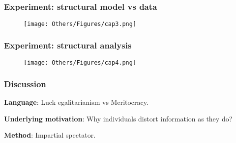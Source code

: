 \documentclass[usenames,dvipsnames,aspectratio=169,11pt, envcountsect]{beamer}
\begin{document}
\begin{frame}\frametitle{Experiment: structural model vs data}
	\begin{figure}
		\texttt{[image: Others/Figures/cap3.png]}
	\end{figure}
\end{frame}

\begin{frame}\frametitle{Experiment: structural analysis}
	\begin{figure}
		\texttt{[image: Others/Figures/cap4.png]}
	\end{figure}
\end{frame}

\begin{frame}\frametitle{Discussion}
	\textbf{Language}: Luck egalitarianism vs Meritocracy.

	\vfill

	\textbf{Underlying motivation}: Why individuals distort information as they do?

	\vfill

	\textbf{Method}: Impartial spectator.
\end{frame}

\begin{comment}

\begin{frame}[noframenumbering,plain]

	\frametitle{References}

	
	


\end{frame}

\end{comment}
\end{document}
